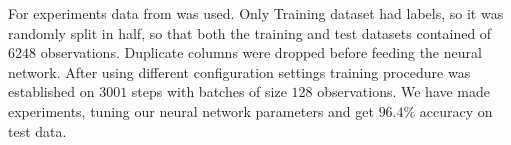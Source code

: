 For experiments data from \cite{data} was used. Only Training dataset had labels, so it was randomly split in half, so that both the training and test datasets contained of $6248$ observations. Duplicate columns were dropped before feeding the neural network. After using different configuration settings training procedure was established on $3001$ steps with batches of size $128$ observations.  We have made experiments, tuning our neural network parameters and get $96.4\%$ accuracy on test data.